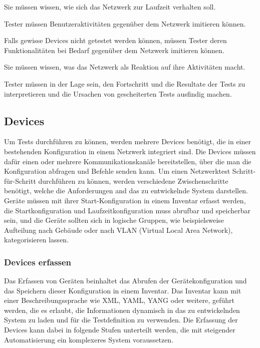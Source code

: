 \documentclass[
	ngerman,
	toc=listof, %
	toc=bibliography, %
	footnotes=multiple, %
	parskip=half, %
	numbers=noendperiod %
]{scrartcl}
\begin{document}
			Sie müssen wissen, wie sich das Netzwerk zur Laufzeit verhalten soll.

			Tester müssen Benutzeraktivitäten gegenüber dem Netzwerk imitieren können.

			Falls gewisse Devices nicht getestet werden können, müssen Tester deren Funktionalitäten bei Bedarf gegenüber dem Netzwerk imitieren können.

			Sie müssen wissen, was das Netzwerk als Reaktion auf ihre Aktivitäten macht.

			Tester müssen in der Lage sein, den Fortschritt und die Resultate der Tests zu interpretieren und die Ursachen von gescheiterten Tests ausfindig machen.


	\subsection{Devices}
	Um Tests durchführen zu können, werden mehrere Devices benötigt, die in einer bestehenden Konfiguration in einem Netzwerk integriert sind.
	Die Devices müssen dafür einen oder mehrere Kommunikationskanäle bereitstellen, über die man die Konfiguration abfragen und Befehle senden kann.
	Um einen Netzwerktest Schritt-für-Schritt durchführen zu können, werden verschiedene Zwischenschritte benötigt, welche die Anforderungen and das zu entwickelnde System darstellen.
	Geräte müssen mit ihrer Start-Konfiguration in einem Inventar erfasst werden, die Startkonfiguration und Laufzeitkonfiguration muss abrufbar und speicherbar sein,
	und die Geräte sollten sich in logische Gruppen, wie beispielsweise Aufteilung nach Gebäude oder nach VLAN (Virtual Local Area Network), kategorisieren lassen.

		\subsubsection{Devices erfassen}
			Das Erfassen von Geräten beinhaltet das Abrufen der Gerätekonfiguration und das Speichern dieser Konfiguration in einem Inventar. 
			Das Inventar kann mit einer Beschreibungssprache wie XML, YAML, YANG oder weitere, geführt werden, die es erlaubt, die Informationen dynamisch in das zu entwickelnden System zu laden und für die Testdefinition zu verwenden.
			Die Erfassung der Devices kann dabei in folgende Stufen unterteilt werden, die mit steigender Automatisierung ein komplexeres System voraussetzen.
\end{document}

